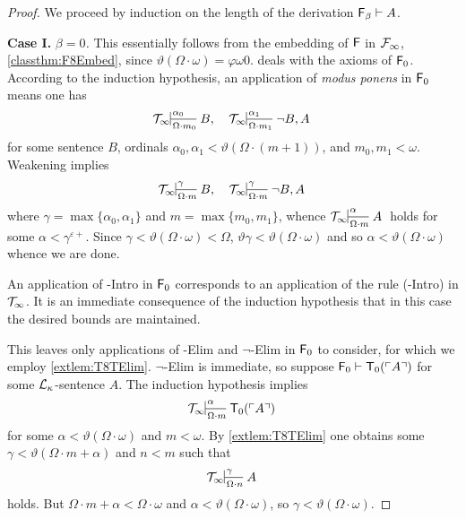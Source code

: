 \documentclass[UKenglish,cleveref,DIV=12]{scrartcl}
\theoremstyle{definition}
\theoremstyle{definition}
\begin{document}
\begin{proof} We proceed by induction on the length of the derivation $\mathsf{F}_\beta\vdash A$.

\noindent\textbf{Case I.} \textit{${\beta=0}$.} This essentially follows from the
embedding of $\mathsf{F}$ in $\mathcal{F}_\infty$, \cref{classthm:F8Embed}, since $\vartheta(\Omega\cdot
\omega)=\varphi \omega0$.  deals with the axioms of $\mathsf{F}_0$. According to the
induction hypothesis, an application of {\em modus ponens} in $\mathsf{F}_0$ means one has
\begin{align*}%
 \Tinfty\prov{\alpha_0}{\Omega\cdot m_0}{B,}&&\Tinfty\prov{\alpha_1}{\Omega\cdot m_1}{\lnot B,A}
\end{align*}
for some sentence $B$, ordinals $\alpha_0,\alpha_1<\vartheta(\Omega\cdot (m+1))$, and
$m_0,m_1<\omega$. Weakening implies
\begin{align*}
 \Tinfty\prov{\gamma}{\Omega\cdot m}{B,}&&\Tinfty\prov{\gamma}{\Omega\cdot m}{\lnot B,A}
\end{align*}
where $\gamma=\max\{\alpha_0,\alpha_1\}$ and $m=\max\{m_0,m_1\}$, whence $\Tinfty\prov\alpha{\Omega\cdot m} A$ holds for some $\alpha<\gamma^{\varepsilon+}$. Since
$\gamma<\vartheta(\Omega\cdot \omega)<\Omega$, $\vartheta\gamma<\vartheta(\Omega\cdot \omega)$ and so $\alpha<\vartheta(\Omega\cdot \omega)$ whence we are done.

An application of -Intro in $\mathsf{F}_0$ corresponds to an application of the
rule (-Intro) in $\mathcal{T}_\infty$. It is an immediate consequence of the induction hypothesis that in this case the desired bounds are maintained.

This leaves only applications of -Elim and $\lnot$-Elim in $\mathsf{F}_0$
to consider, for which we employ \cref{extlem:T8TElim}. $\lnot$-Elim is immediate, so suppose $\mathsf{F}_0\vdash \mathsf{T}_0(\ulcorner{A}\urcorner)$ for some $\mathcal{L}_\kappa$-sentence $A$. The induction hypothesis implies
\begin{align}\label{exteqn:T8embed3}
 \Tinfty\prov\alpha{\Omega\cdot m}{\T_0(\gn A)}
\end{align}
for some $\alpha<\vartheta(\Omega\cdot\omega)$ and $m<\omega$. By \cref{extlem:T8TElim} one obtains some $\gamma<\vartheta(\Omega\cdot m+\alpha)$ and $n<m$ such that
\begin{align*}
 \Tinfty\prov\gamma{\Omega\cdot n}{A}
\end{align*}
holds. But $\Omega\cdot m+\alpha<\Omega\cdot \omega$ and $\alpha<\vartheta(\Omega\cdot \omega)$, so $\gamma<\vartheta(\Omega\cdot\omega)$.


\end{proof}
\end{document}
